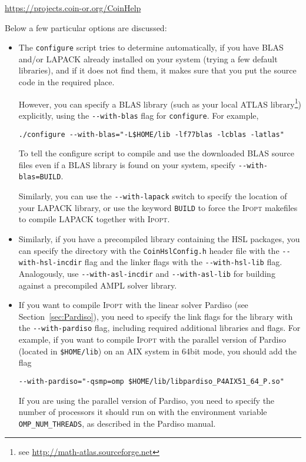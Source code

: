 \documentclass[10pt]{article}
\newcommand{\Ipopt}{\textsc{Ipopt}\xspace}
\begin{document}
\centerline{\url{https://projects.coin-or.org/CoinHelp}}

Below a few particular options are discussed:

\begin{itemize}
\item The {\tt configure} script tries to determine automatically, if
  you have BLAS and/or LAPACK already installed on your system (trying
  a few default libraries), and if it does not find them, it makes
  sure that you put the source code in the required place.

  However, you can specify a BLAS library (such as your local ATLAS
  library\footnote{see \url{http://math-atlas.sourceforge.net}})
  explicitly, using the \verb/--with-blas/ flag for {\tt configure}.
  For example,

  \verb|./configure --with-blas="-L$HOME/lib -lf77blas -lcblas -latlas"| %

  To tell the configure script to compile and use the downloaded BLAS
  source files even if a BLAS library is found on your system, specify
  \verb|--with-blas=BUILD|.

  Similarly, you can use the \verb/--with-lapack/ switch to specify
  the location of your LAPACK library, or use the keyword {\tt BUILD}
  to force the \Ipopt makefiles to compile LAPACK together with
  \Ipopt.

\item Similarly, if you have a precompiled library containing the
  HSL packages, you can specify the directory with the
  \texttt{CoinHslConfig.h} header file with the \verb|--with-hsl-incdir| flag and
  the linker flags with the \verb|--with-hsl-lib| flag. 
  Analogously, use \verb|--with-asl-incdir| and \verb|--with-asl-lib| for
  building against a precompiled AMPL solver library.

\item If you want to compile \Ipopt with the linear solver Pardiso
  (see Section~\ref{sec:Pardiso}), you need to specify the link flags
  for the library with the \verb|--with-pardiso| flag, including
  required additional libraries and flags.  For example, if you want
  to compile \Ipopt with the parallel version of Pardiso (located in
  {\tt \$HOME/lib}) on an AIX system in 64bit mode, you should add the
  flag

  \verb|--with-pardiso="-qsmp=omp $HOME/lib/libpardiso_P4AIX51_64_P.so"|  %

  If you are using the parallel version of Pardiso, you need to
  specify the number of processors it should run on with the
  environment variable \verb|OMP_NUM_THREADS|, as described in the
  Pardiso manual.


\end{itemize}
\end{document}
